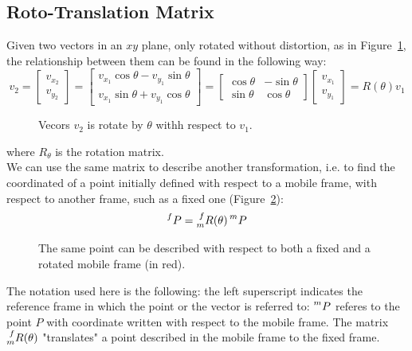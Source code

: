 \documentclass[a4paper,12pt,oneside]{report}
\begin{document}
\subsection{Roto-Translation Matrix}
Given two vectors in an $xy$ plane, only rotated without distortion, as in Figure~\ref{rotation_vectors}, the relationship between them can be found in the following way:
\begin{equation}
  v_2=\begin{bmatrix}
    v_{x_2}\\
    v_{y_2}
  \end{bmatrix}=\begin{bmatrix}
    v_{x_1}\cos{\theta}-v_{y_1}\sin{\theta}\\
    v_{x_1}\sin{\theta}+v_{y_1}\cos{\theta}
  \end{bmatrix}=\begin{bmatrix}
    \cos{\theta} & -\sin{\theta}\\
    \sin{\theta} & \cos{\theta}
  \end{bmatrix}\begin{bmatrix}
    v_{x_1}\\
    v_{y_1}
  \end{bmatrix}=R(\theta)v_1
  \label{rotation_matrix}
\end{equation}
\begin{figure}[h]
  \centering
  
  \caption{Vecors $v_2$ is rotate by $\theta$ withh respect to $v_1$.}
  \label{rotation_vectors}
\end{figure}
where $R_{\theta}$ is the rotation matrix.\\
We can use the same matrix to describe another transformation, i.e. to find the coordinated of a point initially defined with respect to a mobile frame, with respect to another frame, such as a fixed one (Figure~\ref{rotation_point}):
\begin{equation}
  \prescript{f}{}{P}=\prescript{f}{m}{R(\theta)}\prescript{m}{}{P}
\end{equation}
\begin{figure}[h]
  \centering
  
  \caption{The same point can be described with respect to both a fixed and a rotated mobile frame (in red).}
  \label{rotation_point}
\end{figure}
The notation used here is the following: the left superscript indicates the reference frame in which the point or the vector is referred to: $\prescript{m}{}{P}$ referes to the point $P$ with coordinate written with respect to the mobile frame. The matrix $\prescript{f}{m}{R(\theta)}$ "translates" a point described in the mobile frame to the fixed frame.\\
\end{document}
